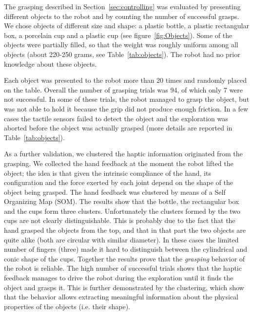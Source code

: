 
The grasping described in Section~\ref{sec:controlling} was
evaluated by presenting different objects to the robot and by
counting the number of successful grasps. We chose objects of
different size and shape: a plastic bottle, a plastic rectangular
box, a porcelain cup and a plastic cup (see
figure~\ref{fig:Objects}). Some of the objects were partially
filled, so that the weight was roughly uniform among all objects
(about 220-250 grams, see Table~\ref{tab:objects}). The robot had
no prior knowledge about these objects.

Each object was presented to the robot more than 20 times and
randomly placed on the table. Overall the number of grasping
trials was 94, of which only 7 were not successful. In some of
these trials, the robot managed to grasp the object, but was not
able to hold it because the grip did not produce enough friction.
In a few cases the tactile sensors failed to detect the object and
the exploration was aborted before the object was actually grasped
(more details are reported in Table~\ref{tab:objects}).

As a further validation, we clustered the haptic information
originated from the grasping. We collected the hand feedback at
the moment the robot lifted the object; the idea is that given the
intrinsic compliance of the hand, its configuration and the force
exerted by each joint depend on the shape of the object being
grasped. The hand feedback was clustered by means of a Self
Organizing Map (SOM). The results show that the bottle, the
rectangular box and the cups form three clusters. Unfortunately
the clusters formed by the two cups are not clearly
distinguishable. This is probably due to the fact that the hand
grasped the objects from the top, and that in that part the two
objects are quite alike (both are circular with similar diameter).
In these cases the limited number of fingers (three) made it hard
to distinguish between the cylindrical and conic shape of the
cups. Together the results prove that the \emph{grasping} behavior
of the robot is reliable. The high number of successful trials
shows that the haptic feedback manages to drive the robot during
the exploration until it finds the object and grasps it. This is
further demonstrated by the clustering, which show that the
behavior allows extracting meaningful information about the
physical properties of the objects (i.e. their shape).

